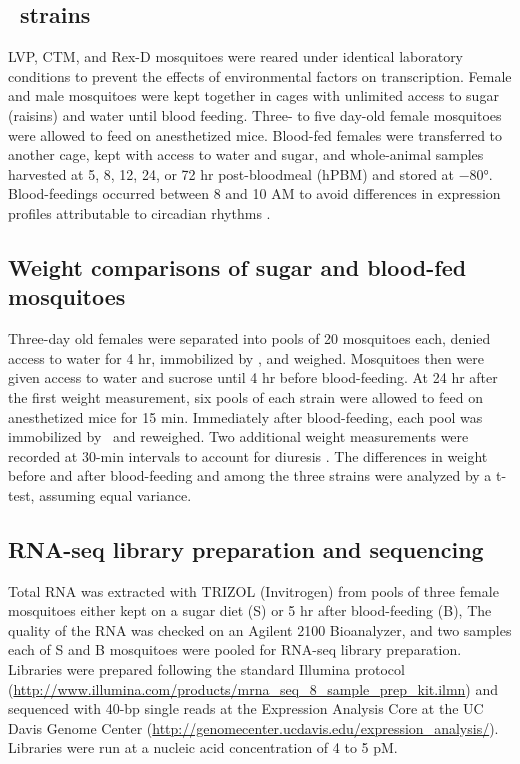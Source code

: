 \subsection{\Aea\ strains}
LVP, CTM, and Rex-D mosquitoes were reared under identical laboratory conditions to prevent the effects of environmental factors on transcription. Female and male mosquitoes were kept together in cages with unlimited access to sugar (raisins) and water until blood feeding. Three- to five day-old female mosquitoes were allowed to feed on anesthetized mice. Blood-fed females were transferred to another cage, kept with access to water and sugar, and whole-animal samples harvested at 5, 8, 12, 24, or 72 hr post-bloodmeal (hPBM) and stored at −80°. Blood-feedings occurred between 8 and 10 AM to avoid differences in expression profiles attributable to circadian rhythms \cite{Ptitsyn2011}.

\subsection{Weight comparisons of sugar and blood-fed mosquitoes}
Three-day old females were separated into pools of 20 mosquitoes each, denied access to water for 4 hr, immobilized by \coo, and weighed. Mosquitoes then were given access to water and sucrose until 4 hr before blood-feeding. At 24 hr after the first weight measurement, six pools of each strain were allowed to feed on anesthetized mice for 15 min. Immediately after blood-feeding, each pool was immobilized by \coo\ and reweighed. Two additional weight measurements were recorded at 30-min intervals to account for diuresis \cite{Stobbart1977}. The differences in weight before and after blood-feeding and among the three strains were analyzed by a t-test, assuming equal variance.

\subsection{RNA-seq library preparation and sequencing}
Total RNA was extracted with TRIZOL (Invitrogen) from pools of three female mosquitoes either kept on a sugar diet (S) or 5 hr after blood-feeding (B), The quality of the RNA was checked on an Agilent 2100 Bioanalyzer, and two samples each of S and B mosquitoes were pooled for RNA-seq library preparation. Libraries were prepared following the standard Illumina protocol (\url{http://www.illumina.com/products/mrna_seq_8_sample_prep_kit.ilmn}) and sequenced with 40-bp single reads at the Expression Analysis Core at the UC Davis Genome Center (\url{http://genomecenter.ucdavis.edu/expression_analysis/}). Libraries were run at a nucleic acid concentration of 4 to 5 pM.

